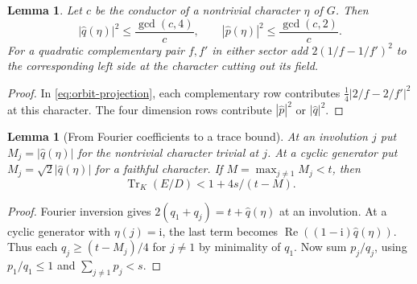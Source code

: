 \documentclass[11pt,reqno]{amsart}
\newtheorem{lemma}[theorem]{Lemma}
\theoremstyle{remark}\newtheorem{remark}[theorem]{Remark}
\numberwithin{equation}{section}
\begin{document}
\begin{lemma}\label{lem:quartic-sector-fourier}
Let $c$ be the conductor of a nontrivial character $\eta$ of $G$.
Then
\[
 |\widehat q(\eta)|^2\le \frac{\gcd(c,4)}{c},\qquad
 |\widehat p(\eta)|^2\le \frac{\gcd(c,2)}{c}.
\]
For a quadratic complementary pair $f,f'$ in either sector add
$2(1/f-1/f')^2$ to the corresponding left side at the character
cutting out its field.
\end{lemma}
\begin{proof}
In \eqref{eq:orbit-projection}, each complementary row contributes
$\frac14|2/f-2/f'|^2$ at this character. The four dimension rows
contribute $|\widehat p|^2$ or $|\widehat q|^2$.
\end{proof}
\begin{lemma}[From Fourier coefficients to a trace bound]\label{lem:quartic-pair-height}
At an involution $j$ put $M_j=|\widehat q(\eta)|$ for the nontrivial character
trivial at $j$. At a cyclic generator put $M_j=\sqrt2|\widehat q(\eta)|$
for a faithful character. If $M=\max_{j\ne1}M_j<t$, then
\[
             \operatorname{Tr}_K(E/D)<1+4s/(t-M).
\]
\end{lemma}
\begin{proof}
Fourier inversion gives $2(q_1+q_j)=t+\widehat q(\eta)$ at an
involution. At a cyclic generator with $\eta(j)=\mathrm i$, the last
term becomes $\operatorname{Re}((1-\mathrm i)\widehat q(\eta))$.
Thus each $q_j\ge(t-M_j)/4$ for $j\ne1$ by minimality of $q_1$.
Now sum $p_j/q_j$, using $p_1/q_1\le1$ and $\sum_{j\ne1}p_j<s$.
\end{proof}
\end{document}

